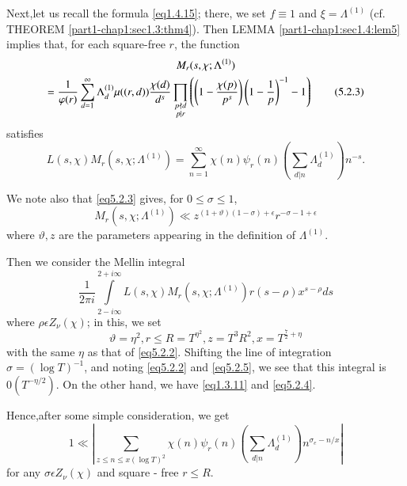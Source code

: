 Next,\pageoriginale let us recall the formula \eqref{eq1.4.15}; there,
we set $f \equiv 1$ 
and $\xi = \Lambda^{(1)}$ (cf. THEOREM
\ref{part1-chap1:sec1.3:thm4}). Then LEMMA
\ref{part1-chap1:sec1.4:lem5} implies that, for each square-free $r$,
the function  
\begin{multline*}
  M_r (s,  \chi ; \Lambda^{(1)}) \\ 
  = \frac{1}{\varphi (r)}
  \sum_{d=1}^{\infty} \Lambda_d^{(1)} \mu ((r,d)) \frac{\chi (d)}{d^s}
  \prod_{\substack{ p \not\mid d \\ p | r}} \left(\left( 1- \frac{\chi
    (p)}{p^s}\right) \left( 1- \frac{1}{p}\right)^{-1} -1\right)
  \tag{5.2.3}\label{eq5.2.3}
\end{multline*}
satisfies
\begin{equation*}
  L(s, \chi ) M_r (s, \chi ; \Lambda^{(1)}) = \sum_{n=1}^{\infty}
  \chi(n) \psi_r (n) \left(\sum_{d|n}
  \Lambda_d^{(1)}\right)n^{-s}. \tag{5.2.4} \label{eq5.2.4} 
\end{equation*}
 
We note also that \eqref{eq5.2.3} gives, for $0 \leq \sigma \leq 1$,
 \begin{equation*}
   M_r (s, \chi ; \Lambda^{(1)}) \ll z^{(1 + \vartheta ) (1 - \sigma )
     + \epsilon  } r^{-\sigma -1 + \epsilon }\tag{5.2.5} \label{eq5.2.5}
  \end{equation*}  
  where $\vartheta,  z$ are the parameters appearing in the definition
  of $\Lambda^{(1)}$. 
  
  Then we consider the Mellin integral
  $$
  \frac{1}{2 \pi i} \int\limits_{2 - i \infty}^{2+ i \infty} L(s, \chi
  )M_r (s, \chi ; \Lambda^{(1)}) r (s- \rho ) x ^{s- \rho} ds 
  $$
  where $\rho \epsilon  Z_\nu (\chi)$; in this, we set
  \begin{equation*}
    \vartheta = \eta^2,  r \leq R = T^{\eta^2},  z = T^3 R^2, x =
    T^{\frac{7}{2} + \eta} \tag{5.2.6} \label{eq5.2.6}
  \end{equation*}  
  with the same $\eta$ as that of \eqref{eq5.2.2}. Shifting the line of
  integration $\sigma = (\log T)^{-1}$,  and noting \eqref{eq5.2.2} and
  \eqref{eq5.2.5}, we see that this integral is $0 (T^{-\eta /2})$. On the
  other hand, we have \eqref{eq1.3.11} and \eqref{eq5.2.4}. 
  
  Hence,\pageoriginale after some simple consideration, we get
  $$
  1 \ll | \sum_{z \leq n \leq x (\log T)^2} \chi (n) \psi_r (n) \left(
  \sum_{d|n} \Lambda_d^{(1)} \right)n^{\sigma_e -n /x}| 
  $$
  for any $\sigma \epsilon  Z_\nu (\chi)$ and square - free $r \leq R$.
  
